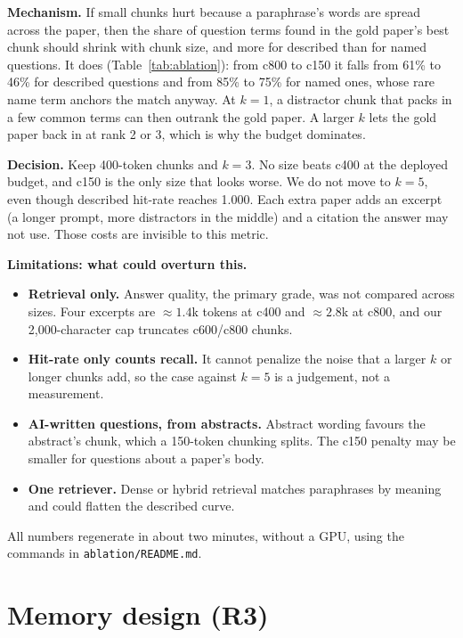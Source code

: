 \documentclass[10pt,letterpaper]{article}
\newcommand{\code}[1]{\texttt{#1}}
\begin{document}
\textbf{Mechanism.} If small chunks hurt because a paraphrase's words are spread across the
paper, then the share of question terms found in the gold paper's best chunk should shrink with
chunk size, and more for described than for named questions. It does (Table~\ref{tab:ablation}):
from c800 to c150 it falls from 61\% to 46\% for described questions and from 85\% to 75\% for
named ones, whose rare name term anchors the match anyway. At $k{=}1$, a distractor chunk that
packs in a few common terms can then outrank the gold paper. A larger $k$ lets the gold paper
back in at rank 2 or 3, which is why the budget dominates.

\textbf{Decision.} Keep 400-token chunks and $k{=}3$. No size beats c400 at the deployed budget,
and c150 is the only size that looks worse. We do not move to $k{=}5$, even though described
hit-rate reaches 1.000. Each extra paper adds an excerpt (a longer prompt, more distractors in
the middle) and a citation the answer may not use. Those costs are invisible to this metric.

\textbf{Limitations: what could overturn this.}
\begin{itemize}
  \item \textbf{Retrieval only.} Answer quality, the primary grade, was not compared across
    sizes. Four excerpts are ${\approx}1.4$k tokens at c400 and ${\approx}2.8$k at c800, and our
    2{,}000-character cap truncates c600/c800 chunks.
  \item \textbf{Hit-rate only counts recall.} It cannot penalize the noise that a larger $k$ or
    longer chunks add, so the case against $k{=}5$ is a judgement, not a measurement.
  \item \textbf{AI-written questions, from abstracts.} Abstract wording favours the abstract's
    chunk, which a 150-token chunking splits. The c150 penalty may be smaller for questions about
    a paper's body.
  \item \textbf{One retriever.} Dense or hybrid retrieval matches paraphrases by meaning and could
    flatten the described curve.
\end{itemize}
All numbers regenerate in about two minutes, without a GPU, using the commands in
\code{ablation/README.md}.

\section{Memory design (R3)}\label{sec:memory}
\end{document}
